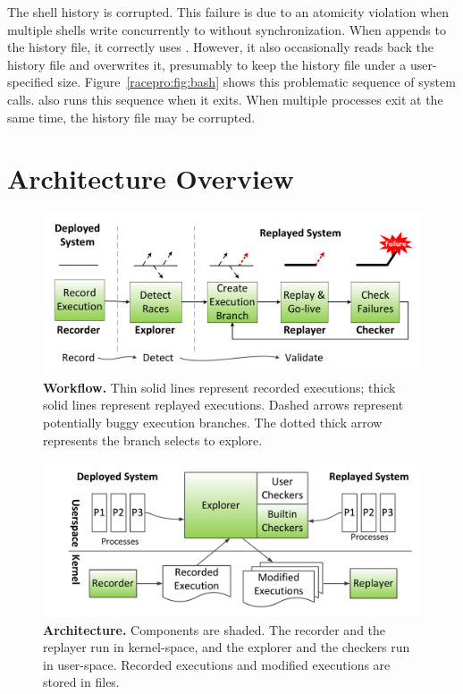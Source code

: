  The  shell history is corrupted.
This failure is due to an atomicity violation
when multiple  shells write concurrently
to  without synchronization.
When  appends to the history file, it correctly uses
.  However, it also occasionally reads back the history
file and overwrites it, presumably to keep the history file under a
user-specified size.  Figure~\ref{racepro:fig:bash} shows this problematic
sequence of system calls.   also runs this sequence when it
exits.  When multiple  processes exit at the same time, the
history file may be corrupted. 

\section{Architecture Overview} \label{racepro:sec:overview}


\begin{figure}[]
  \centering
  \includegraphics[width=0.9\linewidth]{figures/racepro/flow}
  \caption{{\bf \racepro Workflow.} Thin solid lines represent recorded
    executions; thick solid lines represent replayed executions.  Dashed
    arrows represent potentially buggy execution branches. The dotted
    thick arrow represents the branch \racepro selects to
    explore.} \label{racepro:fig:flow}
\end{figure}

\begin{figure}[]
  \centering
  \includegraphics[width=0.9\linewidth]{figures/racepro/arch}
  \caption{{\bf \racepro Architecture.} Components are shaded. The recorder
    and the replayer run in kernel-space, and the explorer and the
    checkers run in user-space.  Recorded executions and modified
    executions are stored in files.} \label{racepro:fig:arch}
\end{figure}



